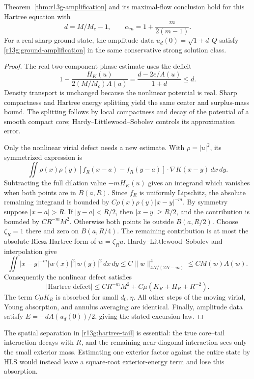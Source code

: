 \begin{proposition}
\label{prop:r13g-hartree}
Theorem~\ref{thm:r13g-amplification} and its maximal-flow conclusion
hold for this Hartree equation with
\[
 d=M/M_c-1,\qquad \alpha_m=1+\frac{m}{2(m-1)}.
\]
For a real sharp ground state, the amplitude data
$u_d(0)=\sqrt{1+d}\,Q$ satisfy
\eqref{r13g:ground-amplification} in the same conservative strong
solution class.
\end{proposition}
\begin{proof}
The real two-component phase estimate uses the deficit
\[
 1-\frac{H_K(u)}{2(M/M_c)A(u)}
 =\frac{d-2e/A(u)}{1+d}\le d.
\]
Density transport is unchanged because the nonlinear potential is
real. Sharp compactness and Hartree energy splitting yield the same
center and surplus-mass bound. The splitting follows by local
compactness and decay of the potential of a smooth compact core;
Hardy--Littlewood--Sobolev controls its approximation error.

Only the nonlinear virial defect needs a new estimate. With
$\rho=|u|^2$, its symmetrized expression is
\[
 \iint\rho(x)\rho(y)
 [f_R(x-a)-f_R(y-a)]\cdot\nabla K(x-y)\,dx\,dy.
\]
Subtracting the full dilation value $-mH_K(u)$ gives an integrand
which vanishes when both points are in $B(a,R)$. Since $f_R$ is
uniformly Lipschitz, the absolute remaining integrand is bounded by
$C\rho(x)\rho(y)|x-y|^{-m}$. By symmetry suppose $|x-a|>R$.
If $|y-a|<R/2$, then $|x-y|\ge R/2$, and the contribution is bounded
by $CR^{-m}M^2$. Otherwise both points lie outside $B(a,R/2)$.
Choose $\zeta_R=1$ there and zero on $B(a,R/4)$. The remaining
contribution is at most the absolute-Riesz Hartree form of
$w=\zeta_Ru$. Hardy--Littlewood--Sobolev and interpolation give
\[
 \iint|x-y|^{-m}|w(x)|^2|w(y)|^2\,dx\,dy
 \le C\|w\|_{4N/(2N-m)}^4
 \le CM(w)A(w).
\]
Consequently the nonlinear defect satisfies
\begin{equation}\label{r13g:hartree-tail}
 |\text{Hartree defect}|
 \le CR^{-m}M^2+C\mu(K_R+H_R+R^{-2}).
\end{equation}
The term $C\mu K_R$ is absorbed for small $d_0,\eta$.
All other steps of the moving virial, Young absorption, and annulus
averaging are identical. Finally, amplitude data satisfy
$E=-dA(u_d(0))/2$, giving the stated excursion law.
\end{proof}

The spatial separation in \eqref{r13g:hartree-tail} is essential:
the true core--tail interaction decays with $R$, and the remaining
near-diagonal interaction sees only the small exterior mass. Estimating
one exterior factor against the entire state by HLS would instead
leave a square-root exterior-energy term and lose this absorption.
